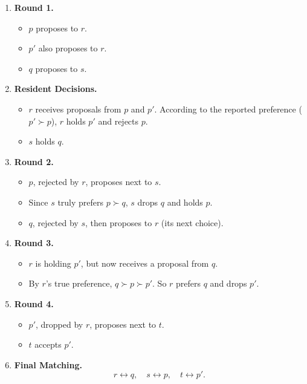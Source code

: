 \documentclass[12pt]{article}
\begin{document}
\begin{enumerate}
    \item \textbf{Round 1.}
    \begin{itemize}
        \item \(p\) proposes to \(r\).
        \item \(p'\) also proposes to \(r\).
        \item \(q\) proposes to \(s\).
    \end{itemize}
    \item \textbf{Resident Decisions.}
    \begin{itemize}
        \item \(r\) receives proposals from \(p\) and \(p'\). 
              According to the reported preference (\(p' \succ p\)), \(r\) holds \(p'\) and rejects \(p\).
        \item \(s\) holds \(q\).
    \end{itemize}
    \item \textbf{Round 2.}
    \begin{itemize}
        \item \(p\), rejected by \(r\), proposes next to \(s\). 
        \item Since \(s\) truly prefers \(p \succ q\), \(s\) drops \(q\) and holds \(p\).
        \item \(q\), rejected by \(s\), then proposes to \(r\) (its next choice).
    \end{itemize}
    \item \textbf{Round 3.}
    \begin{itemize}
        \item \(r\) is holding \(p'\), but now receives a proposal from \(q\). 
        \item By \(r\)'s true preference, \(q \succ p\succ p'\). 
              So \(r\) prefers \(q\) and drops \(p'\).
    \end{itemize}
    \item \textbf{Round 4.}
    \begin{itemize}
        \item \(p'\), dropped by \(r\), proposes next to \(t\). 
        \item \(t\) accepts \(p'\).
    \end{itemize}
    \item \textbf{Final Matching.}
    \[
    r \leftrightarrow q, \quad s \leftrightarrow p, \quad t \leftrightarrow p'.
    \]
\end{enumerate}
\end{document}
